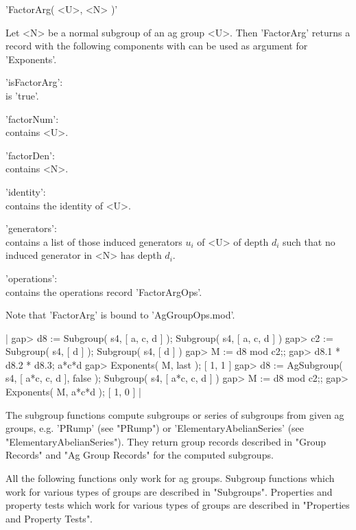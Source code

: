 
'FactorArg( <U>, <N> )'

Let <N> be a normal subgroup of an ag group <U>. Then 'FactorArg' returns
a record with the following components with can  be used  as argument for
'Exponents'.

'isFactorArg': \\
        is 'true'.

'factorNum': \\
        contains <U>.

'factorDen': \\
        contains <N>.

'identity': \\
        contains the identity of <U>.

'generators': \\
        contains  a list  of   those  induced generators  $u_i$  of   <U>
        of  depth   $d_i$  such that no    induced  generator  in <N> has
        depth $d_i$.

'operations': \\
        contains the operations record 'FactorArgOps'.

Note that 'FactorArg' is bound to 'AgGroupOps.mod'.

|    gap> d8 := Subgroup( s4, [ a, c, d ] );
    Subgroup( s4, [ a, c, d ] )
    gap> c2 := Subgroup( s4, [ d ] );
    Subgroup( s4, [ d ] )
    gap> M := d8 mod c2;;
    gap> d8.1 * d8.2 * d8.3;
    a*c*d
    gap> Exponents( M, last );
    [ 1, 1 ]
    gap> d8 := AgSubgroup( s4, [ a*c, c, d ], false );
    Subgroup( s4, [ a*c, c, d ] )
    gap> M := d8 mod c2;;
    gap> Exponents( M, a*c*d );
    [ 1, 0 ] |



The   subgroup functions compute  subgroups   or series of subgroups from
given ag groups, e.g.  'PRump' (see "PRump") or 'ElementaryAbelianSeries'
(see "ElementaryAbelianSeries").  They return group  records described in
"Group Records" and "Ag Group Records" for the computed subgroups.

All the following functions only  work for ag groups.  Subgroup functions
which  work for  various types of  groups are  described  in "Subgroups".
Properties and property tests which work for  various types of groups are
described in "Properties and Property Tests".

